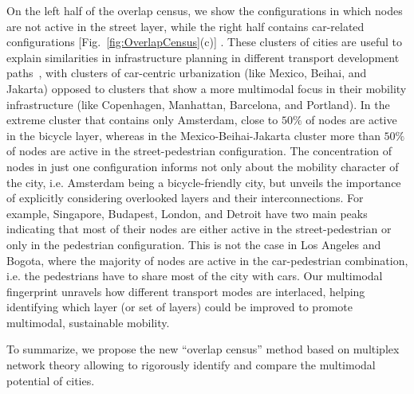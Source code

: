 On the left half of the overlap census, we show the configurations in which nodes are not active in the street layer, while the right half contains car-related configurations [Fig.~\ref{fig:OverlapCensus}(c)] . These clusters of cities are useful to explain similarities in infrastructure planning in different transport development paths~\cite{Rodrigue2013Geography,Louf2014Typology}, with clusters of car-centric urbanization (like Mexico, Beihai, and Jakarta) opposed to clusters that show a more multimodal focus in their mobility infrastructure (like Copenhagen, Manhattan, Barcelona, and Portland). In the extreme cluster that contains only Amsterdam, close to $50\%$ of nodes are active in the bicycle layer, whereas in the Mexico-Beihai-Jakarta cluster more than $50\%$ of nodes are active in the street-pedestrian configuration. The concentration of nodes in just one configuration informs not only about the mobility character of the city, i.e. Amsterdam being a bicycle-friendly city, but unveils the importance of explicitly considering overlooked layers and their interconnections. For example, Singapore, Budapest, London, and Detroit have two main peaks indicating that most of their nodes are either active in the street-pedestrian or only in the pedestrian configuration. This is not the case in Los Angeles and Bogota, where the majority of nodes are active in the car-pedestrian combination, i.e. the pedestrians have to share most of the city with cars. Our multimodal fingerprint unravels how different transport modes are interlaced, helping identifying which layer (or set of layers) could be improved to promote multimodal, sustainable mobility.

To summarize, we propose the new ``overlap census'' method based on multiplex network theory allowing to rigorously identify and compare the multimodal potential of cities.
